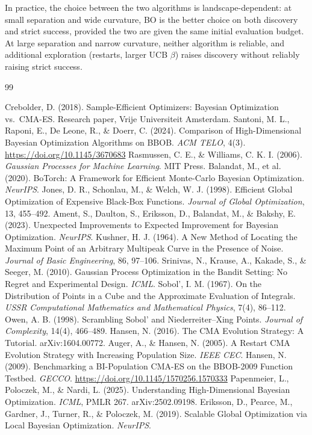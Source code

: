 \documentclass[11pt,a4paper]{article}
\begin{document}
In practice, the choice between the two algorithms is landscape-dependent: at small separation and wide curvature, BO is the better choice on both discovery and strict success, provided the two are given the same initial evaluation budget. At large separation and narrow curvature, neither algorithm is reliable, and additional exploration (restarts, larger UCB $\beta$) raises discovery without reliably raising strict success.

\begin{thebibliography}{99}\small
\setlength{\itemsep}{1pt}

 Crebolder, D. (2018). Sample-Efficient Optimizers: Bayesian Optimization vs.\ CMA-ES. Research paper, Vrije Universiteit Amsterdam.
 Santoni, M. L., Raponi, E., De Leone, R., \& Doerr, C. (2024). Comparison of High-Dimensional Bayesian Optimization Algorithms on BBOB. \emph{ACM TELO}, 4(3). \url{https://doi.org/10.1145/3670683}
 Rasmussen, C. E., \& Williams, C. K. I. (2006). \emph{Gaussian Processes for Machine Learning}. MIT Press.
 Balandat, M., et al. (2020). BoTorch: A Framework for Efficient Monte-Carlo Bayesian Optimization. \emph{NeurIPS}.
 Jones, D. R., Schonlau, M., \& Welch, W. J. (1998). Efficient Global Optimization of Expensive Black-Box Functions. \emph{Journal of Global Optimization}, 13, 455--492.
 Ament, S., Daulton, S., Eriksson, D., Balandat, M., \& Bakshy, E. (2023). Unexpected Improvements to Expected Improvement for Bayesian Optimization. \emph{NeurIPS}.
 Kushner, H. J. (1964). A New Method of Locating the Maximum Point of an Arbitrary Multipeak Curve in the Presence of Noise. \emph{Journal of Basic Engineering}, 86, 97--106.
 Srinivas, N., Krause, A., Kakade, S., \& Seeger, M. (2010). Gaussian Process Optimization in the Bandit Setting: No Regret and Experimental Design. \emph{ICML}.
 Sobol', I. M. (1967). On the Distribution of Points in a Cube and the Approximate Evaluation of Integrals. \emph{USSR Computational Mathematics and Mathematical Physics}, 7(4), 86--112.
 Owen, A. B. (1998). Scrambling Sobol' and Niederreiter--Xing Points. \emph{Journal of Complexity}, 14(4), 466--489.
 Hansen, N. (2016). The CMA Evolution Strategy: A Tutorial. arXiv:1604.00772.
 Auger, A., \& Hansen, N. (2005). A Restart CMA Evolution Strategy with Increasing Population Size. \emph{IEEE CEC}.
 Hansen, N. (2009). Benchmarking a BI-Population CMA-ES on the BBOB-2009 Function Testbed. \emph{GECCO}. \url{https://doi.org/10.1145/1570256.1570333}
 Papenmeier, L., Poloczek, M., \& Nardi, L. (2025). Understanding High-Dimensional Bayesian Optimization. \emph{ICML}, PMLR 267. arXiv:2502.09198.
 Eriksson, D., Pearce, M., Gardner, J., Turner, R., \& Poloczek, M. (2019). Scalable Global Optimization via Local Bayesian Optimization. \emph{NeurIPS}.

\end{thebibliography}
\end{document}
